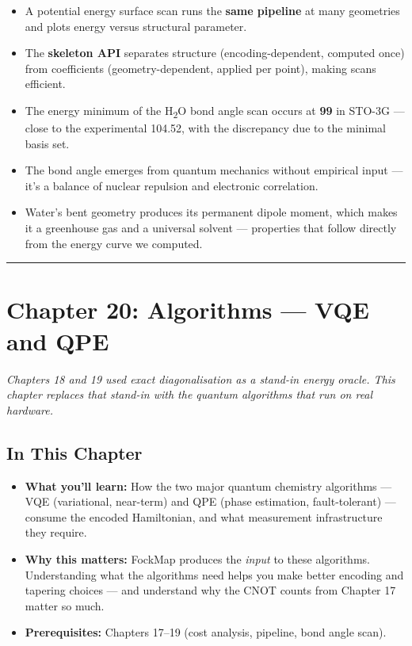 \documentclass[
  11pt,
  oneside]{book}
\providecommand{\tightlist}{%
  \setlength{\itemsep}{0pt}\setlength{\parskip}{0pt}}
\begin{document}
\begin{itemize}
\tightlist
\item
  A potential energy surface scan runs the \textbf{same pipeline} at
  many geometries and plots energy versus structural parameter.
\item
  The \textbf{skeleton API} separates structure (encoding-dependent,
  computed once) from coefficients (geometry-dependent, applied per
  point), making scans efficient.
\item
  The energy minimum of the H\textsubscript{2}O bond angle scan occurs at \textbf{99\textdegree{}}
  in STO-3G --- close to the experimental 104.52\textdegree{}, with the discrepancy
  due to the minimal basis set.
\item
  The bond angle emerges from quantum mechanics without empirical input
  --- it's a balance of nuclear repulsion and electronic correlation.
\item
  Water's bent geometry produces its permanent dipole moment, which
  makes it a greenhouse gas and a universal solvent --- properties that
  follow directly from the energy curve we computed.
\end{itemize}

\begin{center}\rule{0.5\linewidth}{0.5pt}\end{center}

\chapter{Chapter 20: Algorithms --- VQE and
QPE}\label{chapter-20-algorithms-vqe-and-qpe}

\emph{Chapters 18 and 19 used exact diagonalisation as a stand-in energy
oracle. This chapter replaces that stand-in with the quantum algorithms
that run on real hardware.}

\section{In This Chapter}\label{in-this-chapter-19}

\begin{itemize}
\tightlist
\item
  \textbf{What you'll learn:} How the two major quantum chemistry
  algorithms --- VQE (variational, near-term) and QPE (phase estimation,
  fault-tolerant) --- consume the encoded Hamiltonian, and what
  measurement infrastructure they require.
\item
  \textbf{Why this matters:} FockMap produces the \emph{input} to these
  algorithms. Understanding what the algorithms need helps you make
  better encoding and tapering choices --- and understand why the CNOT
  counts from Chapter 17 matter so much.
\item
  \textbf{Prerequisites:} Chapters 17--19 (cost analysis, pipeline, bond
  angle scan).
\end{itemize}
\end{document}
